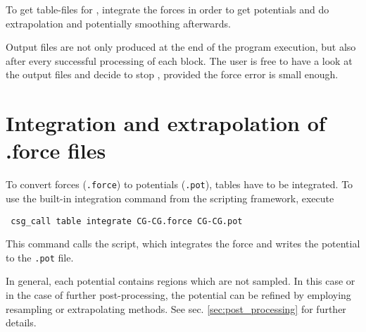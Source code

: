 To get table-files for \gromacs, integrate the forces in order to get potentials and do extrapolation and potentially smoothing afterwards.

Output files are not only produced at the end of the program execution, but also after every successful processing of each block. The user is free to have a look at the output files and decide to stop , provided the force error is small enough.

\section{Integration and extrapolation of .force files }
To convert forces (\texttt{.force}) to potentials (\texttt{.pot}), tables have to be integrated. To use the built-in integration command from the scripting framework, execute
\begin{verbatim}
 csg_call table integrate CG-CG.force CG-CG.pot
\end{verbatim}
This command calls the  script, which integrates the force and writes the potential to the \texttt{.pot} file.

In general, each potential contains regions which are not sampled. In this case or in the case of further post-processing, the potential can be refined by employing resampling or extrapolating methods. See sec. \ref{sec:post_processing} for further details.
